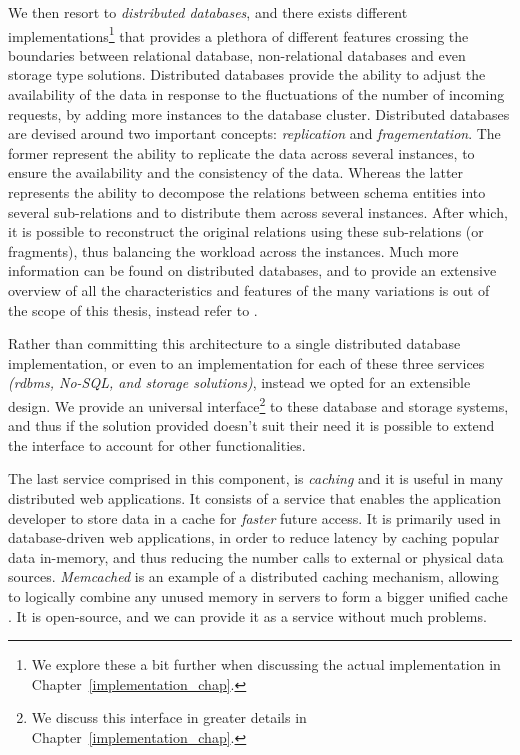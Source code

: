 \documentclass[12pt, titlepage]{uo_temp}
\begin{document}
     We then resort to \emph{distributed databases}, and there exists different
     implementations\footnote{We explore these a bit further when discussing the actual
       implementation in Chapter~\ref{implementation_chap}.} that provides a plethora of
     different features crossing the boundaries between relational database,
     non-relational databases and even storage type solutions. Distributed databases
     provide the ability to adjust the availability of the data in response to the
     fluctuations of the number of incoming requests, by adding more instances to the
     database cluster. Distributed databases are devised around two important concepts:
     \emph{replication} and \emph{fragementation}. The former represent the ability to
     replicate the data across several instances, to ensure the availability and the
     consistency of the data. Whereas the latter represents the ability to decompose the
     relations between schema entities into several sub-relations and to distribute them
     across several instances. After which, it is possible to reconstruct the original
     relations using these sub-relations (or fragments), thus balancing the workload
     across the instances. Much more information can be found on distributed databases,
     and to provide an extensive overview of all the characteristics and features of the
     many variations is out of the scope of this thesis, instead refer to
     \cite{linders1976distributed} \cite{draffan1980distributed}
     \cite{ozsu2011principles}.
     
     Rather than committing this architecture to a single distributed database
     implementation, or even to an implementation for each of these three services
     \emph{(\gls{rdbms}, No-SQL, and storage solutions)}, instead we opted for an
     extensible design. We provide an universal interface\footnote{We discuss this
       interface in greater details in Chapter~\ref{implementation_chap}.} to these
     database and storage systems, and thus if the solution provided doesn't suit their
     need it is possible to extend the interface to account for other functionalities.
     
     The last service comprised in this component, is \emph{caching} and it is useful in
     many distributed web applications. It consists of a service that enables the
     application developer to store data in a cache for \emph{faster} future access. It is
     primarily used in database-driven web applications, in order to reduce latency by
     caching popular data in-memory, and thus reducing the number calls to external or
     physical data sources. \emph{Memcached} is an example of a distributed caching
     mechanism, allowing to logically combine any unused memory in servers to form a
     bigger unified cache \cite{fitzpatrick2011memcached}. It is open-source, and we can
     provide it as a service without much problems.
\end{document}
